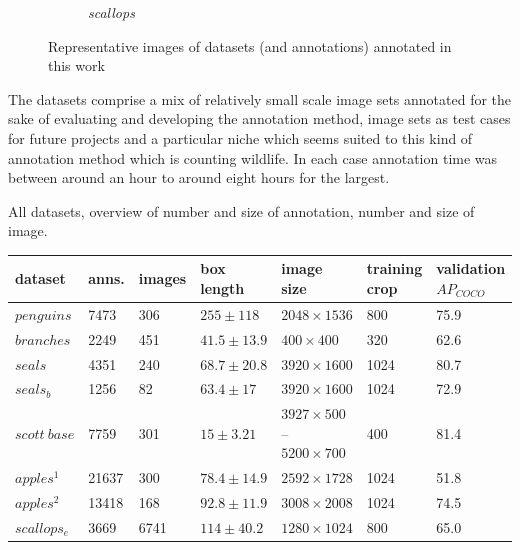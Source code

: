 \begin{figure}[h!]
\begin{subfigure}[t]{0.24\linewidth}
  \caption{\emph{scallops}}
\end{subfigure}
\caption{Representative images of datasets (and annotations) annotated in this work}
\label{fig:datasets_all}
\end{figure}

The datasets comprise a mix of relatively small scale image sets annotated for the sake of evaluating and developing the annotation method, image sets as test cases for future projects and a particular niche which seems suited to this kind of annotation method which is counting wildlife. In each case annotation time was between around an hour to around eight hours for the largest.

\begin{threeparttable}[!h]
\label{tab:resolutions}
\centering
\caption{All datasets, overview of number and size of annotation, number and size of image.  } 
\begin{tabular}{lllllll}
dataset & anns. & images & box length & image size & \shortstack{training \\ crop} & \shortstack{validation \\ $AP_{COCO}$} \\
\toprule
$penguins$        & 7473        & 306    & $255 \pm 118$   &  $2048\times1536$  & 800                                   & 75.9                   \\
$branches$        & 2249        & 451    & $41.5 \pm 13.9$ &  $400\times400$    & 320                                   & 62.6                   \\
$seals$           & 4351        & 240    & $68.7 \pm 20.8$ &  $3920\times1600$  & 1024                                    & 80.7                   \\
$seals_b$         & 1256        & 82     & $63.4 \pm 17$   & $3920\times1600$  & 1024                                                     & 72.9        \\
$scott\:base$     & 7759        & 301    & $15 \pm 3.21$     & \shortstack[l]{$3927\times500$ -- \\ $5200\times700$} & 400  & 81.4  \\
$apples^1$        & 21637       & 300    & $78.4 \pm 14.9$ &  $2592\times1728$ & 1024 & 51.8                   \\
$apples^2$        & 13418       & 168    & $92.8 \pm 11.9$ &  $3008\times2008$  & 1024                                    & 74.5                   \\
$scallops_e$      & 3669        & 6741   & $114 \pm 40.2$  &  $1280\times1024$  & 800                                   & 65.0                   \\

\end{tabular}
\end{threeparttable}
